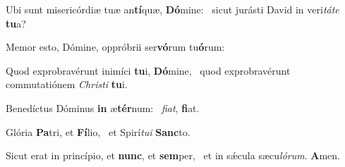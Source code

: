 \item Ubi sunt misericórdiæ tuæ an\textbf{tí}quæ, \textbf{Dó}mine:~\psstar{} sicut jurásti David in veri\textit{táte} \textbf{tu}a?
\item Memor esto, Dómine, oppróbrii ser\textbf{vó}rum tu\textbf{ó}rum:~\psstar{} 
\item Quod exprobravérunt inimíci \textbf{tu}i, \textbf{Dó}mine,~\psstar{} quod exprobravérunt commutatiónem \textit{Christi} \textbf{tu}i.
\item Benedíctus Dóminus \textbf{in} æ\textbf{tér}num:~\psstar{} \textit{fiat}, \textbf{fi}at.
\item Glória \textbf{Pa}tri, et \textbf{Fí}lio,~\psstar{} et Spirí\textit{tui} \textbf{Sanc}to.
\item Sicut erat in princípio, et \textbf{nunc}, et \textbf{sem}per,~\psstar{} et in sǽcula sæcu\textit{lórum}. \textbf{A}men.